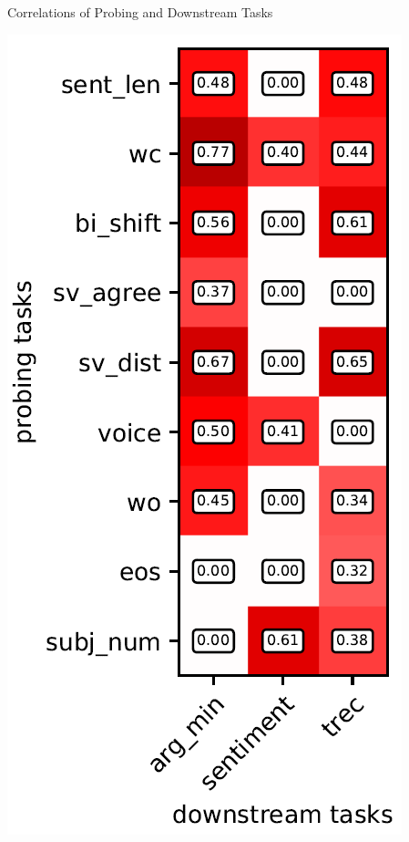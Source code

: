 \documentclass[accentcolor=tud1a,colorbacktitle,inverttitle,landscape,german,presentation,t]{tudbeamer}
\begin{document}
\begin{frame}{Correlations of Probing and Downstream Tasks}{}
	\vspace*{-4mm}
	\begin{minipage}{0.29\textwidth}
		\begin{center}
			\includegraphics[scale=0.25]{images/spearman_corr_en_f1}
		\end{center}
	\end{minipage}
	\hfill
	\begin{minipage}{0.69\textwidth}

\end{minipage}
\end{frame}
\end{document}
